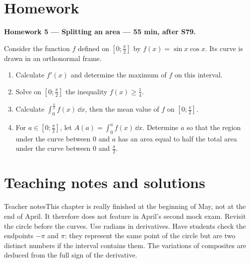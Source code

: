 \section{Homework}\textbf{Homework 5 --- Splitting an area --- 55 min, after S79.}\par Consider the function $f$ defined on $[0;\frac\pi2]$ by $f(x)=\sin x\cos x$. Its curve is drawn in an orthonormal frame.
\begin{enumerate}\item Calculate $f' (x)$ and determine the maximum of $f$ on this interval.
\item Solve on $[0;\frac\pi2]$ the inequality $f(x)\ge\frac14$.
\item Calculate $\displaystyle\int_0^{\frac{\pi}{2}}f(x)\,\dd x$, then the mean value of $f$ on $[0;\frac\pi2]$.
\item For $a\in[0;\frac\pi2]$, let $A(a)=\displaystyle\int_0^a f(x)\,\dd x$. Determine $a$ so that the region under the curve between $0$ and $a$ has an area equal to half the total area under the curve between $0$ and $\frac\pi2$.\end{enumerate}

\ifprof\clearpage\section{Teaching notes and solutions}\begin{profbox}{Teacher notes}This chapter is really finished at the beginning of May, not at the end of April. It therefore does not feature in April's second mock exam. Revisit the circle before the curves. Use radians in derivatives. Have students check the endpoints $-\pi$ and $\pi$: they represent the same point of the circle but are two distinct numbers if the interval contains them. The variations of composites are deduced from the full sign of the derivative.\end{profbox}

